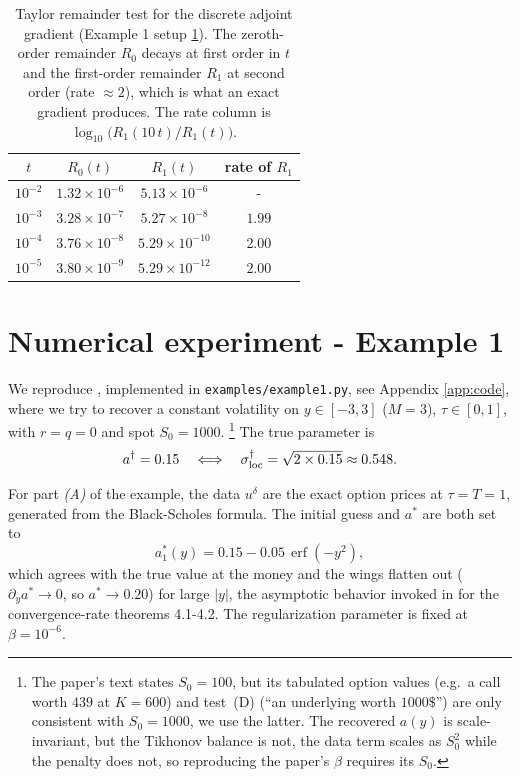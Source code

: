 \begin{table}[h]
    \centering
    \begin{tabular}{c c c c}
        \toprule
        $t$ & $R_0(t)$ & $R_1(t)$ & rate of $R_1$ \\
        \midrule
        $10^{-2}$ & $1.32\times10^{-6}$ & $5.13\times10^{-6}$ & - \\
        $10^{-3}$ & $3.28\times10^{-7}$ & $5.27\times10^{-8}$ & $1.99$ \\
        $10^{-4}$ & $3.76\times10^{-8}$ & $5.29\times10^{-10}$ & $2.00$ \\
        $10^{-5}$ & $3.80\times10^{-9}$ & $5.29\times10^{-12}$ & $2.00$ \\
        \bottomrule
    \end{tabular}
    \caption{
        Taylor remainder test for the discrete adjoint gradient (Example 1 setup \ref{sec:egger_ex1}).
        The zeroth-order remainder $R_0$ decays at first order in $t$ and the
        first-order remainder $R_1$ at second order (rate $\approx 2$),
        which is what an exact gradient produces.
        The rate column is $\log_{10}\!\bigl(R_1(10\,t)/R_1(t)\bigr)$.
    }
    \label{tab:taylor_test}
\end{table}

\section{Numerical experiment - Example 1}\label{sec:egger_ex1}

We reproduce \cite[Example 1]{egger2005tikhonov},
implemented in \texttt{examples/example1.py}, see Appendix \ref{app:code},
where we try to recover a constant volatility on $y \in [-3,3]$ ($M = 3$), $\tau \in [0,1]$,
with $r = q = 0$ and spot $S_0 = 1000$.
\footnote{
    The paper's text states $S_0 = 100$,
    but its tabulated option values (e.g.\ a call worth $439$ at $K = 600$)
    and test~(D) (``an underlying worth $1000\$$'')
    are only consistent with $S_0 = 1000$, we use the latter.
    The recovered $a(y)$ is scale-invariant,
    but the Tikhonov balance is not,
    the data term scales as $S_0^2$ while the penalty does not,
    so reproducing the paper's $\beta$ requires its $S_0$.
}
The true parameter is
\[
    a^\dagger = 0.15 \quad \Longleftrightarrow \quad \sigma_{\mathrm{loc}}^\dagger = \sqrt{2 \times 0.15} \approx 0.548.
\]

For part \emph{(A)} of the example,
the data $u^\delta$ are the exact option prices at $\tau = T = 1$,
generated from the Black-Scholes formula.
The initial guess and $a^*$ are both set to
\[
    a^*_1(y) = 0.15 - 0.05\,\operatorname{erf}(-y^2),
\]
which agrees with the true value at the money and the wings flatten out ($\partial_y a^* \to 0$,
so $a^* \to 0.20$) for large $|y|$, the asymptotic behavior invoked in
\cite{egger2005tikhonov} for the convergence-rate theorems 4.1-4.2.
The regularization parameter is fixed at $\beta = 10^{-6}$.

